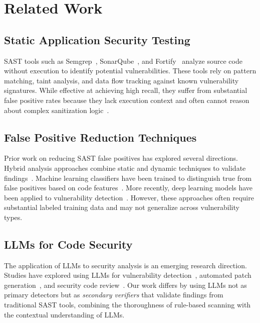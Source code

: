 \documentclass[conference]{IEEEtran}
\begin{document}
\section{Related Work}
\label{sec:related}

\subsection{Static Application Security Testing}
SAST tools such as Semgrep~\cite{semgrep2023}, SonarQube~\cite{sonarqube2023}, and Fortify~\cite{chess2004static} analyze source code without execution to identify potential vulnerabilities. These tools rely on pattern matching, taint analysis, and data flow tracking against known vulnerability signatures. While effective at achieving high recall, they suffer from substantial false positive rates because they lack execution context and often cannot reason about complex sanitization logic~\cite{johnson2013don}.

\subsection{False Positive Reduction Techniques}
Prior work on reducing SAST false positives has explored several directions. Hybrid analysis approaches combine static and dynamic techniques to validate findings~\cite{lam2017combining}. Machine learning classifiers have been trained to distinguish true from false positives based on code features~\cite{delaitre2015nist, flynn2018prioritizing}. More recently, deep learning models have been applied to vulnerability detection~\cite{li2021vulnerability, zhou2019devign}. However, these approaches often require substantial labeled training data and may not generalize across vulnerability types.

\subsection{LLMs for Code Security}
The application of LLMs to security analysis is an emerging research direction. Studies have explored using LLMs for vulnerability detection~\cite{thapa2022transformer}, automated patch generation~\cite{pearce2023examining}, and security code review~\cite{li2023large}. Our work differs by using LLMs not as primary detectors but as \textit{secondary verifiers} that validate findings from traditional SAST tools, combining the thoroughness of rule-based scanning with the contextual understanding of LLMs.
\end{document}
